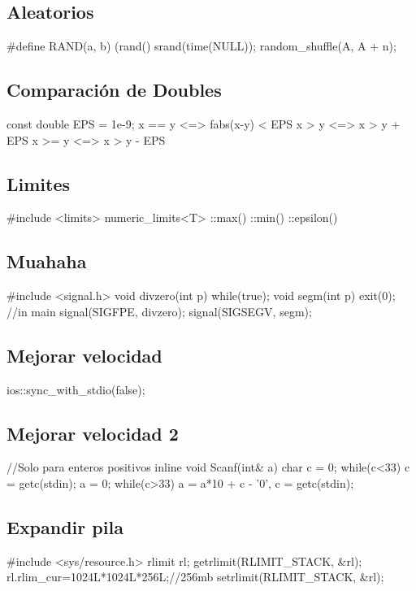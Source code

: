 \subsection*{Aleatorios}
\begin{code}
#define RAND(a, b) (rand()%
srand(time(NULL));
random_shuffle(A, A + n);
\end{code}
\subsection*{Comparación de Doubles}
\begin{code}
const double EPS = 1e-9;
x == y	<=> fabs(x-y) < EPS
x >  y	<=> x > y + EPS
x >= y	<=> x > y - EPS
\end{code}
\subsection*{Limites}
\begin{code}
#include <limits>
numeric_limits<T>
	::max()
	::min()
	::epsilon()
\end{code}
\subsection*{Muahaha}
\begin{code}
#include <signal.h>
void divzero(int p){
	while(true);}
void segm(int p){
	exit(0);}
//in main
signal(SIGFPE, divzero);
signal(SIGSEGV, segm);
\end{code}
\subsection*{Mejorar velocidad}
\begin{code}
ios::sync_with_stdio(false);
\end{code}
\subsection*{Mejorar velocidad 2}
\begin{code}
//Solo para enteros positivos
inline void Scanf(int& a){
	char c = 0;
	while(c<33) c = getc(stdin);
	a = 0;
	while(c>33)	a = a*10 + c - '0', c = getc(stdin);
}
\end{code}
\subsection*{Expandir pila}
\begin{code}
#include <sys/resource.h>
rlimit rl;
getrlimit(RLIMIT_STACK, &rl);
rl.rlim_cur=1024L*1024L*256L;//256mb
setrlimit(RLIMIT_STACK, &rl);
\end{code}
